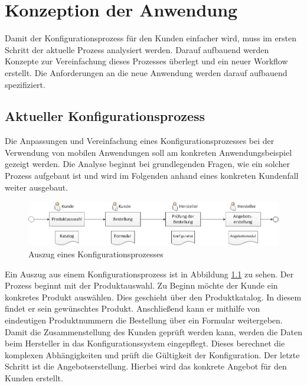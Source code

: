\chapter{Konzeption der Anwendung}\label{chapter_3}
Damit der Konfigurationsprozess für den Kunden einfacher wird, muss im ersten Schritt der aktuelle Prozess analysiert werden. Darauf aufbauend werden Konzepte zur Vereinfachung dieses Prozesses überlegt und ein neuer Workflow erstellt. Die Anforderungen an die neue Anwendung werden darauf aufbauend spezifiziert.

\section{Aktueller Konfigurationsprozess}
Die Anpassungen und Vereinfachung eines Konfigurationsprozesses bei der Verwendung von mobilen Anwendungen soll am konkreten Anwendungsbeispiel gezeigt werden. Die Analyse beginnt bei grundlegenden Fragen, wie ein solcher Prozess aufgebaut ist und wird im Folgenden anhand eines konkreten Kundenfall weiter ausgebaut.

\begin{figure}
\label{oldWorkflow}
\centering
\includegraphics[width=\hsize]{images/konfigurationsprozess_alt}
\caption{Auszug eines Konfigurationsprozesses}
\end{figure}
Ein Auszug aus einem Konfigurationsprozess ist in Abbildung  \ref{oldWorkflow} zu sehen. Der Prozess beginnt mit der Produktauswahl. Zu Beginn möchte der Kunde ein konkretes Produkt auswählen. Dies geschieht über den Produktkatalog. In diesem findet er sein gewünschtes Produkt. Anschließend kann er mithilfe von eindeutigen Produktnummern die Bestellung über ein Formular weitergeben. Damit die Zusammenstellung des Kunden geprüft werden kann, werden die Daten beim Hersteller in das Konfigurationssystem eingepflegt. Dieses berechnet die komplexen Abhängigkeiten und prüft die Gültigkeit der Konfiguration. Der letzte Schritt ist die Angebotserstellung. Hierbei wird das konkrete Angebot für den Kunden erstellt.
\par

